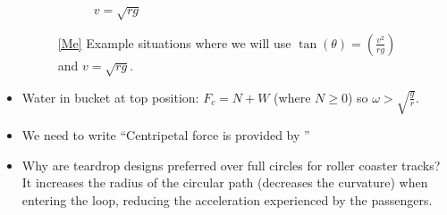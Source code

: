 \documentclass[oneside]{book}
\begin{document}
\begin{itemize}[label=\(\square\)]
\begin{figure}[H]
\begin{subfigure}[c]{0.35\textwidth}
            \vspace{0.5cm}
            \caption{\(v=\sqrt{rg}\)}
        \end{subfigure}%
        \caption{\ref{Me} Example situations where we will use \(\tan(\theta)=\left(\frac{v^2}{rg}\right)\) and \(v=\sqrt{rg}\).}
        \label{table:circular-motion-examples}
    \end{figure}
    \item Water in bucket at top position: \(F_c=N+W\) (where \(N\geq 0\)) so \(\omega>\sqrt{\frac{g}{r}}\).
    \item We need to write ``Centripetal force is provided by \underline{\hspace{1cm}}'' 
    \item Why are teardrop designs preferred over full circles for roller coaster tracks? It increases the radius of the circular path (decreases the curvature) when entering the loop, reducing the acceleration experienced by the passengers.
\end{itemize}
\end{document}
